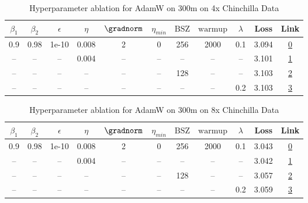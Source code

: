 \begin{table}[H]
\centering
\caption{Hyperparameter ablation for AdamW on 300m on 4x Chinchilla Data}
\label{tab:ablation_adamw_300m_on_4x_chinchilla_data}
\begin{tabular}{ccccccccccc}
\toprule
$\beta_1$ & $\beta_2$ & $\epsilon$ & $\eta$ & $\gradnorm$ & $\eta_{min}$ & $\mathrm{BSZ}$ & $\mathrm{warmup}$ & $\lambda$ & Loss & Link \\
\midrule
0.9 & 0.98 & 1e-10 & 0.008 & 2 & 0 & 256 & 2000 & 0.1 & 3.094 & \href{https://wandb.ai/stanford-mercury/optimizer-scaling/runs/sweep-300m-24B-adamw5dcabdlr0.008-wd0.1-minlr0-warmup2000-b10.9--5e75fb}{0} \\
\midrule
-- & -- & -- & 0.004 & -- & -- & -- & -- & -- & 3.101 & \href{https://wandb.ai/stanford-mercury/optimizer-scaling/runs/sweep-300m-24B-adamwae7cf4lr0.004-wd0.1-minlr0-warmup2000-b10.9--ee3fd2}{1} \\
-- & -- & -- & -- & -- & -- & 128 & -- & -- & 3.103 & \href{https://wandb.ai/stanford-mercury/optimizer-scaling/runs/sweep-300m-24B-adamw07fc6elr0.008-wd0.1-minlr0-warmup2000-b10.9--459481}{2} \\
-- & -- & -- & -- & -- & -- & -- & -- & 0.2 & 3.103 & \href{https://wandb.ai/stanford-mercury/optimizer-scaling/runs/sweep-300m-24B-adamw4476fflr0.008-wd0.2-minlr0-warmup2000-b10.9--1eec01}{3} \\
\bottomrule
\end{tabular}
\end{table}

\begin{table}[H]
\centering
\caption{Hyperparameter ablation for AdamW on 300m on 8x Chinchilla Data}
\label{tab:ablation_adamw_300m_on_8x_chinchilla_data}
\begin{tabular}{ccccccccccc}
\toprule
$\beta_1$ & $\beta_2$ & $\epsilon$ & $\eta$ & $\gradnorm$ & $\eta_{min}$ & $\mathrm{BSZ}$ & $\mathrm{warmup}$ & $\lambda$ & Loss & Link \\
\midrule
0.9 & 0.98 & 1e-10 & 0.008 & 2 & 0 & 256 & 2000 & 0.1 & 3.043 & \href{https://wandb.ai/stanford-mercury/optimizer-scaling/runs/sweep-300m-48B-adamw07fc6elr0.008-wd0.1-minlr0-warmup2000-b10.9--b38246}{0} \\
\midrule
-- & -- & -- & 0.004 & -- & -- & -- & -- & -- & 3.042 & \href{https://wandb.ai/stanford-mercury/optimizer-scaling/runs/sweep-300m-48B-adamw2537edlr0.004-wd0.1-minlr0-warmup2000-b10.9--a59fd5}{1} \\
-- & -- & -- & -- & -- & -- & 128 & -- & -- & 3.057 & \href{https://wandb.ai/stanford-mercury/optimizer-scaling/runs/sweep-300m-48B-adamw6a50aflr0.008-wd0.1-minlr0-warmup2000-b10.9--22e2a7}{2} \\
-- & -- & -- & -- & -- & -- & -- & -- & 0.2 & 3.059 & \href{https://wandb.ai/stanford-mercury/optimizer-scaling/runs/sweep-300m-48B-adamw7d9e60lr0.008-wd0.2-minlr0-warmup2000-b10.9--dfe5c9}{3} \\
\bottomrule
\end{tabular}
\end{table}

